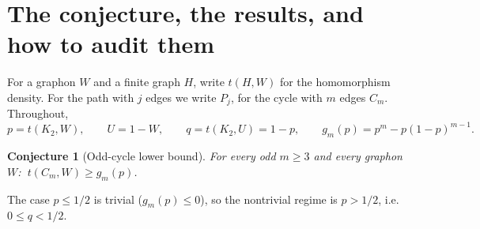 \documentclass[11pt]{article}
\newtheorem{conjecture}[theorem]{Conjecture}
\begin{document}
{\small\tableofcontents}

\section{The conjecture, the results, and how to audit them}\label{sec:status}

For a graphon $W$ and a finite graph $H$, write $t(H,W)$ for the homomorphism density.  For the path with $j$ edges we write $P_j$, for the cycle with $m$ edges $C_m$.  Throughout,
\[
        p=t(K_2,W),\qquad U=1-W,\qquad q=t(K_2,U)=1-p,
\qquad
        g_m(p)=p^m-p(1-p)^{m-1}.
\]

\begin{conjecture}[Odd-cycle lower bound]\label{conj:main}
For every odd $m\ge3$ and every graphon $W$: $\ t(C_m,W)\ge g_m(p)$.
\end{conjecture}

The case $p\le1/2$ is trivial ($g_m(p)\le0$), so the nontrivial regime is $p>1/2$, i.e.\ $0\le q<1/2$.
\end{document}

